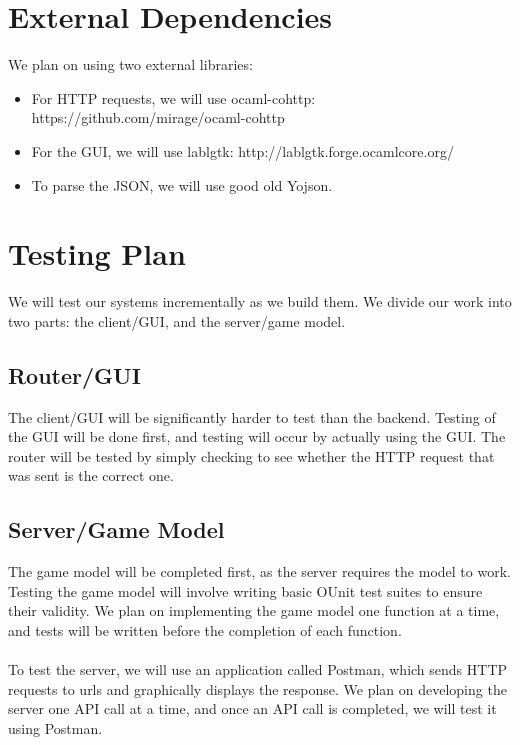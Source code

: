 \documentclass{article}
\begin{document}
    \section{External Dependencies}
    We plan on using two external libraries:
    \begin{itemize}
   	 \item For HTTP requests, we will use ocaml-cohttp: https://github.com/mirage/ocaml-cohttp
    	\item For the GUI, we will use lablgtk: http://lablgtk.forge.ocamlcore.org/ 
	\item To parse the JSON, we will use good old Yojson.
    \end{itemize}   

    \section{Testing Plan}
    We will test our systems incrementally as we build them. We divide our work into two parts: the client/GUI, and the server/game model.
    
    \subsection{Router/GUI}
    The client/GUI will be significantly harder to test than the backend. Testing of the GUI will be done first, and testing will occur by actually using the GUI. The router will be tested by simply checking to see whether the HTTP request that was sent is the correct one.
    
    \subsection{Server/Game Model}
    The game model will be completed first, as the server requires the model to work. Testing the game model will involve writing basic OUnit test suites to ensure their validity. We plan on implementing the game model one function at a time, and tests will be written before the completion of each function. \\
    \\
    To test the server, we will use an application called Postman, which sends HTTP requests to urls and graphically displays the response. We plan on developing the server one API call at a time, and once an API call is completed, we will test it using Postman.


	
\end{document}
